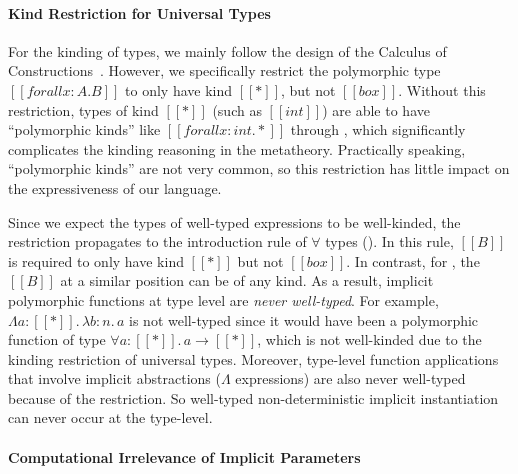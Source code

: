 \paragraph{Kind Restriction for Universal Types}
\label{sec:kind-restriction}

For the kinding of types, we mainly follow the design of the Calculus of
Constructions~\cite{coc}. However, we specifically restrict
the polymorphic type $[[forall x : A. B]]$ to only have kind $[[*]]$, but not $[[box]]$.
Without this restriction, types of kind $[[*]]$ (such as $[[int]]$) are able to
have ``polymorphic kinds'' like $[[forall x : int. *]]$ through ,
which significantly complicates the kinding reasoning in the metatheory.
Practically speaking, ``polymorphic kinds'' are not very common, so this
restriction has little impact on the expressiveness of our language.

Since we expect the types of well-typed expressions to be well-kinded,
the restriction propagates to the introduction rule of $\forall$ types ().
In this rule, $[[B]]$ is required to only have kind $[[*]]$ but not $[[box]]$.
In contrast, for , the $[[B]]$ at a similar position can be of any kind.
As a result, implicit polymorphic functions at type level are \emph{never well-typed}.
For example, $\Lambda a : [[*]].\, \lambda b : n.\, a$ is not
well-typed since it would have been a polymorphic function of type
$\forall a : [[*]].\, a \rightarrow [[*]]$, which is not well-kinded due to the
kinding restriction of universal types.
Moreover, type-level function applications that involve implicit
abstractions ($\Lambda$ expressions) are also never well-typed
because of the restriction. So well-typed non-deterministic implicit instantiation can never occur
at the type-level.

\paragraph{Computational Irrelevance of Implicit Parameters}

